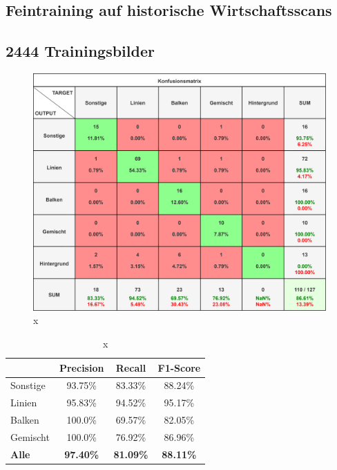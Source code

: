 \subsection{Feintraining auf historische Wirtschaftsscans}
\subsection*{2444 Trainingsbilder}
\begin{figure}[H]
    \centering
    \captionsetup{width=1\linewidth}
    \includegraphics[width=1\textwidth]{Experimente/img/detect/val@0.891 20240612-093743_double/konfusionsmatrix.png}
    \caption{ x}
    \label{fig:extraction_output}
\end{figure}

\begin{table}[H]
    \centering
    \begin{tabular}{|l|c|c|c|}
        \hline
        \rowcolor[HTML]{EFEFEF}
                      & Precision        & Recall           & F1-Score         \\ \hline
        Sonstige      & 93.75\%          & 83.33\%          & 88.24\%          \\ \hline
        Linien        & 95.83\%          & 94.52\%          & 95.17\%          \\ \hline
        Balken        & 100.0\%          & 69.57\%          & 82.05\%          \\ \hline
        Gemischt      & 100.0\%          & 76.92\%          & 86.96\%          \\ \hline
        \textbf{Alle} & \textbf{97.40\%} & \textbf{81.09\%} & \textbf{88.11\%} \\ \hline
    \end{tabular}
    \caption{x}
\end{table}


